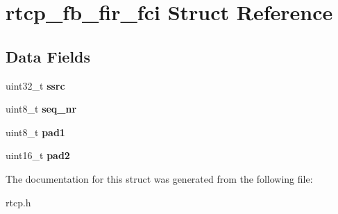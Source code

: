 \section{rtcp\+\_\+fb\+\_\+fir\+\_\+fci Struct Reference}
\label{structrtcp__fb__fir__fci}
\subsection*{Data Fields}
\begin{DoxyCompactItemize}
\item 
\mbox{\label{structrtcp__fb__fir__fci_a8e0aae345ecd30e9fa2df1e61cae3c2c}} 
uint32\+\_\+t {\bfseries ssrc}
\item 
\mbox{\label{structrtcp__fb__fir__fci_a89ba3656dfa524034a51b3d64583306e}} 
uint8\+\_\+t {\bfseries seq\+\_\+nr}
\item 
\mbox{\label{structrtcp__fb__fir__fci_a246f916119f841d0201c49eefb2f7bcb}} 
uint8\+\_\+t {\bfseries pad1}
\item 
\mbox{\label{structrtcp__fb__fir__fci_aa3dfcd97f39ff9434e178da2c8b0bd12}} 
uint16\+\_\+t {\bfseries pad2}
\end{DoxyCompactItemize}


The documentation for this struct was generated from the following file\+:\begin{DoxyCompactItemize}
\item 
rtcp.\+h\end{DoxyCompactItemize}
